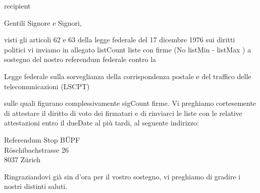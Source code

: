 \documentclass[a4paper,10pt,parskip=half,italian]{scrlttr2}
\begin{document}
\begin{letter}{ {{ recipient }} }





\opening{Gentili Signore e Signori,}

visti gli articoli 62 e 63 della legge federale del 17 dicembre 1976 sui diritti politici vi inviamo in allegato {{ listCount }} liste con firme (No {{ listMin }} - {{ listMax }}) a sostegno del nostro referendum federale contro la

\leftskip=3mm
Legge federale sulla sorveglianza della corrispondenza postale e del traffico delle telecomunicazioni (LSCPT)

\leftskip=0mm
sulle quali figurano complessivamente {{ sigCount }} firme. Vi preghiamo cortesemente di attestare il diritto di voto dei firmatari e di rinviarci le liste con le relative attestazioni entro il {{ dueDate }} al più tardi, al seguente indirizzo:

\leftskip=3mm
Referendum Stop BÜPF \\
Röschibachstrasse 26 \\
8037 Zürich

\leftskip=0mm
\closing{Ringraziandovi già sin d’ora per il vostro sostegno, vi preghiamo di gradire i nostri distinti saluti.}

\end{letter}
\end{document}
